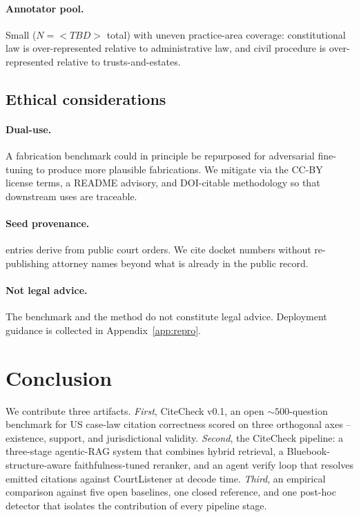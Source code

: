 \documentclass[11pt]{article}
\begin{document}
\paragraph{Annotator pool.} Small ($N = <TBD>$ total) with uneven
practice-area coverage: constitutional law is over-represented
relative to administrative law, and civil procedure is
over-represented relative to trusts-and-estates.

\subsection{Ethical considerations}
\label{sec:discussion:ethics}

\paragraph{Dual-use.} A fabrication benchmark could in principle be
repurposed for adversarial fine-tuning to produce more plausible
fabrications. We mitigate via the CC-BY license terms, a README
advisory, and DOI-citable methodology so that downstream uses are
traceable.

\paragraph{Seed provenance.} \citet{charlotin2025tracker} entries
derive from public court orders. We cite docket numbers without
re-publishing attorney names beyond what is already in the public
record.

\paragraph{Not legal advice.} The benchmark and the method do not
constitute legal advice. Deployment guidance is collected in
Appendix~\ref{app:repro}.

\section{Conclusion}
\label{sec:conclusion}

We contribute three artifacts. \emph{First}, CiteCheck v0.1, an open
${\sim}500$-question benchmark for US case-law citation correctness
scored on three orthogonal axes -- existence, support, and
jurisdictional validity. \emph{Second}, the CiteCheck pipeline: a
three-stage agentic-RAG system that combines hybrid retrieval, a
Bluebook-structure-aware faithfulness-tuned reranker, and an agent
verify loop that resolves emitted citations against CourtListener at
decode time. \emph{Third}, an empirical comparison against five open
baselines, one closed reference, and one post-hoc detector that
isolates the contribution of every pipeline stage.
\end{document}
